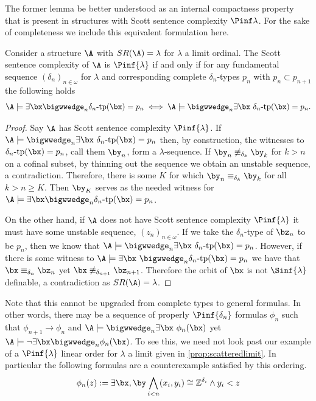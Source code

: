\documentclass{amsart}
\newcommand{\SR}{SR}
\newcommand{\Z}{\mathbb{Z}}
\begin{document}
The former lemma be better understood as an internal compactness property that
is present in structures with Scott sentence complexity  $\Pinf\lambda$. For the sake of completeness we include this equivalent formulation here.

\begin{corollary}
Consider a structure $\A$ with $\SR(\A)=\lambda$ for $\lambda$ a limit ordinal. The Scott sentence complexity
of $\A$ is $\Pinf{\lambda}$ if and only if for any fundamental sequence
$(\delta_n)_{n\in\omega}$ for $\lambda$ and corresponding complete $\delta_n$-types $p_n$ with $p_n\subset p_{n+1}$ the following holds
\[\A\models \exists \bx \bigwwedge_{n}\delta_n\text{-tp}(\bx)=p_n \iff \A\models
\bigwwedge_{n}\exists \bx\ \delta_n\text{-tp}(\bx)=p_n.\]
\end{corollary}

\begin{proof}
Say $\A$ has Scott sentence complexity $\Pinf{\lambda}$. If $\A\models 
\bigwwedge_{n}\exists \bx\ \delta_n\text{-tp}(\bx)=p_n$ then, by construction, the witnesses to
$\delta_n\text{-tp}(\bx)=p_n$, call them $\by_n$, form a $\lambda$-sequence. If
$\by_n\not\equiv_{\delta_{k}} \by_{k}$ for $k>n$ on a cofinal subset, by
thinning out the sequence we obtain an unstable sequence, a contradiction.
Therefore, there is some $K$ for which $\by_n\equiv_{\delta_{k}} \by_{k}$ for
all $k>n\geq K$. Then $\by_K$ serves as the needed witness for
$\A\models \exists \bx \bigwwedge_{n}\delta_n\text{-tp}(\bx)=p_n$. 

On the other hand, if $\A$ does not have Scott sentence complexity
$\Pinf{\lambda}$ it must have some unstable sequence, $(z_n)_{n\in\omega}$. If
we take the $\delta_n$-type of $\bz_n$ to be $p_n$, then we know that $\A\models
\bigwwedge_{n}\exists \bx~ \delta_n\text{-tp}(\bx)=p_n$. However, if there is
some witness to $\A\models \exists \bx\ \bigwwedge_{n}\delta_n\text{-tp}(\bx)=p_n$
we have that $\bx\equiv_{\delta_n}\bz_n$ yet
$\bx\not\equiv_{\delta_{n+1}}\bz_{n+1}$. Therefore the orbit of $\bx$ is not
$\Sinf{\lambda}$ definable, a contradiction as $\SR(\A)=\lambda$.
\end{proof}

Note that this cannot be upgraded from complete types to general formulas. In other
words, there may be a sequence of properly $\Pinf{\delta_n}$ formulas
$\phi_n$ such that $\phi_{n+1}\to\phi_n$ and $\A\models \bigwwedge_{n}\exists
\bx~ \phi_n(\bx)$ yet $\A\models \lnot \exists \bx\bigwwedge_{n} \phi_n(\bx)$.
To see this, we need not look past our example of a $\Pinf{\lambda}$ linear
order for $\lambda$ a limit given in \cref{prop:scatteredlimit}. In particular the following formulas are
a counterexample satisfied by this ordering.
\[\phi_n(z):=\exists\bx,\by \bigwedge_{i<n} (x_i,y_i)\cong \Z^{\delta_i}\land y_i<z\] 
\end{document}
